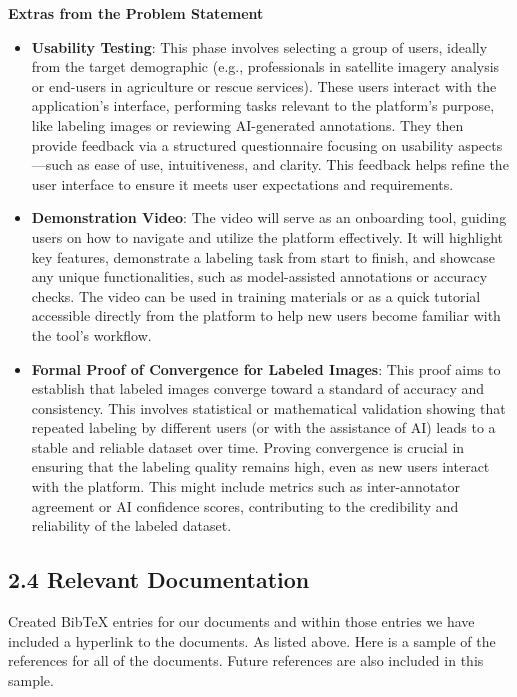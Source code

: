 \documentclass[12pt, titlepage]{article}
\begin{document}
\textbf{Extras from the Problem Statement} \cite{Problem_Statement}

\begin{itemize}
    \item \textbf{Usability Testing}: This phase involves selecting a group of users, ideally from the target demographic (e.g., professionals in satellite imagery analysis or end-users in agriculture or rescue services). These users interact with the application's interface, performing tasks relevant to the platform's purpose, like labeling images or reviewing AI-generated annotations. They then provide feedback via a structured questionnaire focusing on usability aspects—such as ease of use, intuitiveness, and clarity. This feedback helps refine the user interface to ensure it meets user expectations and requirements.

    \item \textbf{Demonstration Video}: The video will serve as an onboarding tool, guiding users on how to navigate and utilize the platform effectively. It will highlight key features, demonstrate a labeling task from start to finish, and showcase any unique functionalities, such as model-assisted annotations or accuracy checks. The video can be used in training materials or as a quick tutorial accessible directly from the platform to help new users become familiar with the tool's workflow.

    \item \textbf{Formal Proof of Convergence for Labeled Images}: This proof aims to establish that labeled images converge toward a standard of accuracy and consistency. This involves statistical or mathematical validation showing that repeated labeling by different users (or with the assistance of AI) leads to a stable and reliable dataset over time. Proving convergence is crucial in ensuring that the labeling quality remains high, even as new users interact with the platform. This might include metrics such as inter-annotator agreement or AI confidence scores, contributing to the credibility and reliability of the labeled dataset.
\end{itemize}
  
\subsection{2.4 Relevant Documentation}

\bigskip
Created BibTeX entries for our documents and within those entries we have included a hyperlink to the documents. As listed above. Here is a sample of the references for all of the documents. Future references are also included in this sample. \\
\end{document}
